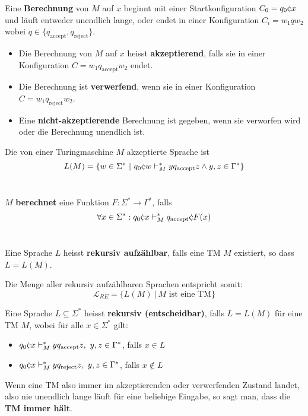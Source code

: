 \begin{definition}
Eine \textbf{Berechnung} von \(M\) auf \(x\) beginnt mit einer Startkonfiguration \(C_0 = q_0 \stopsym x\) und läuft entweder unendlich lange, oder endet in einer Konfiguration \(C_i = w_1 q w_2 \) wobei \(q \in \{q_\text{accept}, q_\text{reject}\}\).\\
\end{definition}

\begin{definition}
\begin{itemize}
  \item Die Berechnung von \(M\) auf \(x\) heisst \textbf{akzeptierend}, falls sie in einer Konfiguration \(C = w_1 q_\text{accept} w_2\) endet.
  \item Die Berechnung ist \textbf{verwerfend}, wenn sie in einer Konfiguration \(C = w_1 q_\text{reject} w_2\).
  \item Eine \textbf{nicht-akzeptierende} Berechnung ist gegeben, wenn sie verworfen wird oder die Berechnung unendlich ist.\\
\end{itemize}
\end{definition}

\begin{definition}
Die von einer Turingmaschine \(M\) akzeptierte Sprache ist
\[
L(M) = \{w \in \Sigma^* \ |\ q_0 \stopsym w \vdash_M^* y q_\text{accept} z \land y,z \in \Gamma^* \}
\]\\
\end{definition}

\begin{definition}
\(M\) \textbf{berechnet} eine Funktion \(F: \Sigma^* \to \Gamma^*\), falls
\[
\forall x\in \Sigma^*: q_0 \stopsym x \vdash_M^* q_\text{accept} \stopsym F(x)
\]\\
\end{definition}

\begin{definition}
Eine Sprache \(L\) heisst \textbf{rekursiv aufzählbar}, falls eine TM \(M\) existiert, so dass \(L = L(M)\).

Die Menge aller rekursiv aufzählbaren Sprachen entspricht somit:
\[
\mathcal{L}_{RE} = \{L(M) \ |\ M \text{ ist eine TM}\}
\]
\end{definition}

\begin{definition}
Eine Sprache \(L \subseteq \Sigma^*\) heisst \textbf{rekursiv (entscheidbar)}, falls \(L = L(M)\) für eine TM \(M\), wobei für alle \(x \in \Sigma^*\) gilt:
\begin{itemize}
  \item \(q_0 \stopsym x \vdash_M^* y q_\text{accept} z,\ y,z \in \Gamma^*\), falls \(x \in L\)
  \item \(q_0 \stopsym x \vdash_M^* y q_\text{reject} z,\ y,z \in \Gamma^*\), falls \(x \notin L\)
\end{itemize}

Wenn eine TM also immer im akzeptierenden oder verwerfenden Zustand landet, also nie unendlich lange läuft für eine beliebige Eingabe, so sagt man, dass die \textbf{TM immer hält}.

\end{definition}

